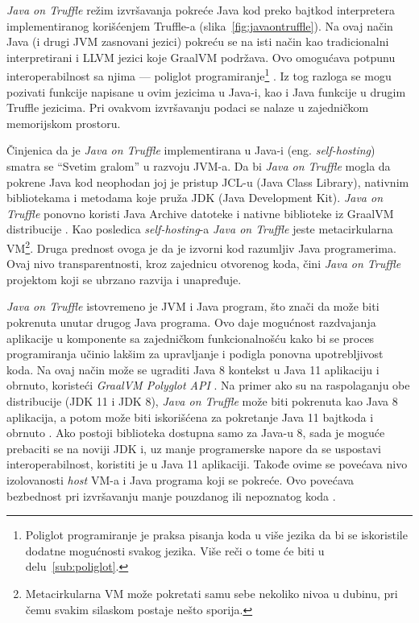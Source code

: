 \documentclass[a4paper]{article}
\begin{document}
\emph{Java on Truffle} režim izvršavanja pokreće Java kod preko bajtkod interpretera implementiranog korišćenjem Truffle-a (slika~\ref{fig:javaontruffle}). Na ovaj način Java (i drugi JVM zasnovani jezici) pokreću se na isti način kao tradicionalni interpretirani i LLVM jezici koje GraalVM podržava. Ovo omogućava potpunu interoperabilnost sa njima --- poliglot programiranje\footnote{Poliglot programiranje je praksa pisanja koda u više jezika da bi se iskoristile dodatne mogućnosti svakog jezika. Više reči o tome će biti u delu~\ref{sub:poliglot}.} \cite{grooteman2017java,graalvmjavaontruffle}. Iz tog razloga se mogu pozivati funkcije napisane u ovim jezicima u Java-i, kao i Java funkcije u drugim Truffle jezicima. Pri ovakvom izvršavanju podaci se nalaze u zajedničkom memorijskom prostoru.

Činjenica da je \emph{Java on Truffle} implementirana u Java-i (eng. \emph{self-hosting}) smatra se ``Svetim gralom'' u razvoju JVM-a. Da bi \emph{Java on Truffle} mogla da pokrene Java kod neophodan joj je pristup JCL-u (Java Class Library), nativnim bibliotekama i metodama koje pruža JDK (Java Development Kit). \emph{Java on Truffle} ponovno koristi Java Archive datoteke i nativne biblioteke iz GraalVM distribucije \cite{grooteman2017java}. Kao posledica \emph{self-hosting}-a \emph{Java on Truffle} jeste metacirkularna VM\footnote{Metacirkularna VM može pokretati samu sebe nekoliko nivoa u dubinu, pri čemu svakim silaskom postaje nešto sporija.}. Druga prednost ovoga je da je izvorni kod razumljiv Java programerima. Ovaj nivo transparentnosti, kroz zajednicu otvorenog koda, čini \emph{Java on Truffle} projektom koji se ubrzano razvija i unapređuje.

\emph{Java on Truffle} istovremeno je JVM i Java program, što znači da može biti pokrenuta unutar drugog Java programa. Ovo daje mogućnost razdvajanja aplikacije u komponente sa zajedničkom funkcionalnošću kako bi se proces programiranja učinio lakšim za upravljanje i podigla ponovna upotrebljivost koda. Na ovaj način može se ugraditi Java 8 kontekst u Java 11 aplikaciju i obrnuto, koristeći \emph{GraalVM Polyglot API} \cite{graalvmjavaontruffle}. Na primer ako su na raspolaganju obe distribucije (JDK 11 i JDK 8),
\emph{Java on Truffle} može biti pokrenuta kao Java 8 aplikacija, a potom može biti iskorišćena za pokretanje Java 11 bajtkoda i obrnuto \cite{grooteman2017java}. Ako postoji biblioteka dostupna samo za Java-u 8, sada je moguće prebaciti se na noviji JDK i, uz manje programerske napore da se uspostavi interoperabilnost, koristiti je u Java 11 aplikaciji. Takođe ovime se povećava nivo izolovanosti \emph{host} VM-a i Java programa koji se pokreće. Ovo povećava bezbednost pri izvršavanju manje pouzdanog ili nepoznatog koda \cite{graalvmjavaontruffle}.
\end{document}
